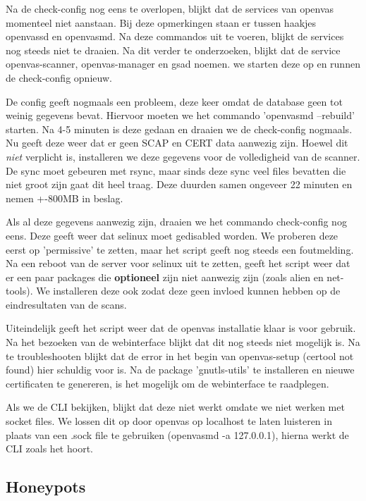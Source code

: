 Na de check-config nog eens te overlopen, blijkt dat de services van openvas momenteel niet aanstaan. Bij deze opmerkingen staan er tussen haakjes openvassd en openvasmd. Na deze commandos uit te voeren, blijkt de services nog steeds niet te draaien. Na dit verder te onderzoeken, blijkt dat de service openvas-scanner, openvas-manager en gsad noemen. we starten deze op en runnen de check-config opnieuw. 

De config geeft nogmaals een probleem, deze keer omdat de database geen tot weinig gegevens bevat. Hiervoor moeten we het commando 'openvasmd --rebuild' starten. Na 4-5 minuten is deze gedaan en draaien we de check-config nogmaals. Nu geeft deze weer dat er geen SCAP en CERT data aanwezig zijn. Hoewel dit \textit{niet} verplicht is, installeren we deze gegevens voor de volledigheid van de scanner. De sync moet gebeuren met rsync, maar sinds deze sync veel files bevatten die niet groot zijn gaat dit heel traag. Deze duurden samen ongeveer 22 minuten en nemen +-800MB in beslag. 

Als al deze gegevens aanwezig zijn, draaien we het commando check-config nog eens. Deze geeft weer dat selinux moet gedisabled worden. We proberen deze eerst op 'permissive' te zetten, maar het script geeft nog steeds een foutmelding. Na een reboot van de server voor selinux uit te zetten, geeft het script weer dat er een paar packages die \textbf{optioneel} zijn niet aanwezig zijn (zoals alien en net-tools). We installeren deze ook zodat deze geen invloed kunnen hebben op de eindresultaten van de scans.

Uiteindelijk geeft het script weer dat de openvas installatie klaar is voor gebruik. Na het bezoeken van de webinterface blijkt dat dit nog steeds niet mogelijk is. Na te troubleshooten blijkt dat de error in het begin van openvas-setup (certool not found) hier schuldig voor is. Na de package 'gnutls-utils' te installeren en nieuwe certificaten te genereren, is het mogelijk om de webinterface te raadplegen. 

Als we de CLI bekijken, blijkt dat deze niet werkt omdate we niet werken met socket files. We lossen dit op door openvas op localhost te laten luisteren in plaats van een .sock file te gebruiken (openvasmd -a 127.0.0.1), hierna werkt de CLI zoals het hoort.

\subsection{Honeypots}

